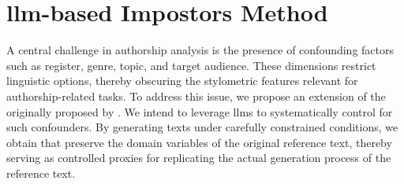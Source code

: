\chapter{\acs{llm}-based Impostors Method}
\label{chap:llm_impostor_method}

A central challenge in authorship analysis is the presence of confounding factors such as register, genre, topic, and target audience. 
These dimensions restrict linguistic options, thereby obscuring the stylometric features relevant for authorship-related tasks. 
To address this issue, we propose an extension of the \impAppr{} originally proposed by \citet{koppel_determining_2014}.
We intend to leverage \acp{llm} to systematically control for such confounders. 
By generating texts under carefully constrained conditions, we obtain \imps{} that preserve the domain variables of the original reference text, thereby serving as controlled proxies for replicating the actual generation process of the reference text.






